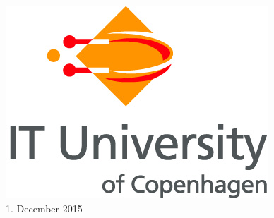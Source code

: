 \begin{titlepage}


\includegraphics[scale=0.5]{./Figures/ITU_logo_ENG.jpg}\\[1cm] %


{\large 1. December 2015}\\[2cm] %


\vfill %

\end{titlepage}